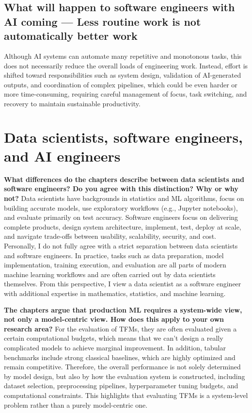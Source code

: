 \documentclass[11pt]{article}
\begin{document}
\subsection{What will happen to software engineers with AI coming --- Less routine work is not automatically better work}
Although AI systems can automate many repetitive and monotonous tasks, this does not necessarily reduce the overall loads of engineering work. Instead, effort is shifted toward responsibilities such as system design, validation of AI-generated outputs, and coordination of complex pipelines, which could be even harder or more time-consuming, requiring careful management of focus, task switching, and recovery to maintain sustainable productivity.

\section{Data scientists, software engineers, and AI engineers}

\textbf{What differences do the chapters describe between data scientists and software engineers? Do you agree with this distinction? Why or why not?}
Data scientists have backgrounds in statistics and ML algorithms, focus on building accurate models, use exploratory workflows (e.g., Jupyter notebooks), and evaluate primarily on test accuracy. Software engineers focus on delivering complete products, design system architecture, implement, test, deploy at scale, and navigate trade-offs between usability, scalability, security, and cost. Personally, I do not fully agree with a strict separation between data scientists and software engineers. In practice, tasks such as data preparation, model implementation, training execution, and evaluation are all  parts of modern machine learning workflows and are often carried out by data scientists themselves. From this perspective, I view a data scientist as a software engineer with additional expertise in mathematics, statistics, and machine learning. 


\textbf{The chapters argue that production ML requires a system-wide view, not only a model-centric view. How does this apply to your own research area?}
For the evaluation of TFMs, they are often evaluated given a certain computational budgets, which means that we can't design a really complicated models to achieve marginal improvement. In addition, tabular benchmarks include strong classical baselines, which are highly optimized and remain competitive. Therefore, the overall performance is not solely determined by model design, but also by how the evaluation system is constructed, including dataset selection, preprocessing pipelines, hyperparameter tuning budgets, and computational constraints. This highlights that evaluating TFMs is a system-level problem rather than a purely model-centric one. 
\end{document}

